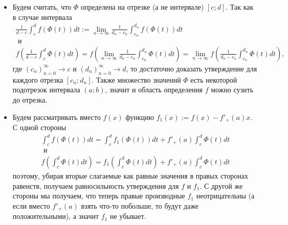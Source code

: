 \documentclass[12pt,a4paper]{article}
\begin{document}
\begin{enumproblem}
\begin{enumerate}
\begin{itemize}
                \item Будем считать, что $\Phi$ определена на отрезке (а не интервале) $[c; d]$. Так как в случае интервала
                    \begin{gather*}
                        \frac{1}{d - c} \int_c^d f(\Phi(t)) dt := \lim_{n \to \infty} \frac{1}{d_n - c_n} \int_{c_n}^{d_n} f(\Phi(t)) dt\\
                        \text{ и }\\
                        f\left(\frac{1}{d - c} \int_c^d \Phi(t) dt\right) = f\left(\lim_{n \to \infty} \frac{1}{d_n - c_n} \int_{c_n}^{d_n} \Phi(t) dt\right) = \lim_{n \to \infty} f\left(\frac{1}{d_n - c_n} \int_{c_n}^{d_n} \Phi(t) dt\right),
                    \end{gather*}
                    где $(c_n)_{n=0}^\infty \to c$ и $(d_n)_{n=0}^\infty \to d$, то достаточно доказать утверждение для каждого отрезка $[c_n; d_n]$. Также множество значений $\Phi$ есть некоторой подотрезок интервала $(a; b)$, значит и область определения $f$ можно сузить до отрезка.

                \item Будем рассматривать вместо $f(x)$ функцию $f_1(x) := f(x) - f'_+(a) x$. С одной стороны
                    \begin{gather*}
                        \int_c^d f(\Phi(t))dt = \int_c^d f_1(\Phi(t)) dt + f'_+(a) \int_c^d \Phi(t)dt\\
                        \text{ и }\\
                        f\left(\int_c^d \Phi(t)dt\right) = f_1\left(\int_c^d \Phi(t)dt\right) + f'_+(a) \int_c^d \Phi(t)dt
                    \end{gather*}
                    поэтому, убирая вторые слагаемые как равные значения в правых сторонах равенств, получаем равносильность утверждения для $f$ и $f_1$. С другой же стороны мы получаем, что теперь правые производные $f_1$ неотрицательны (а если вместо $f'_+(a)$ взять что-то побольше, то будут даже положительными), а значит $f_1$ не убывает.
            \end{itemize}
            

\end{enumerate}
\end{enumproblem}
\end{document}
